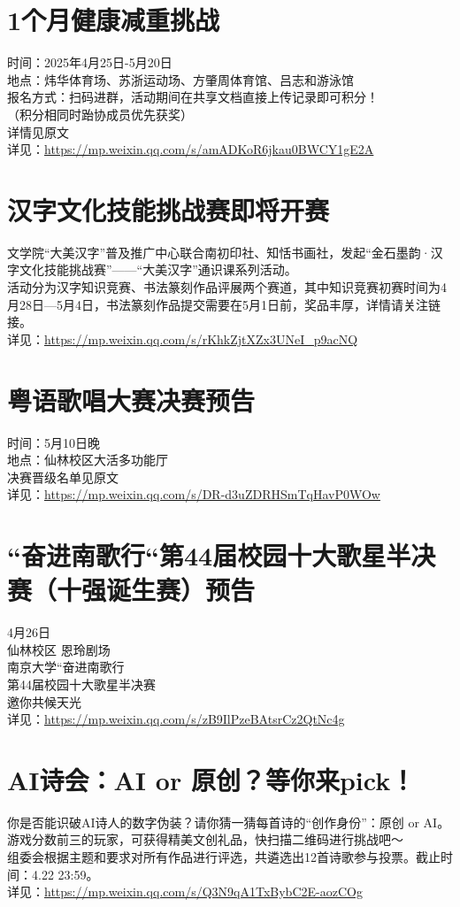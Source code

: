 \documentclass[letterpaper, 12pt]{article}
\begin{document}
\begin{multicols}{2}
\section{1个月健康减重挑战} %
时间：2025年4月25日-5月20日
\\地点：炜华体育场、苏浙运动场、方肇周体育馆、吕志和游泳馆
\\报名方式：扫码进群，活动期间在共享文档直接上传记录即可积分！ 
\\ （积分相同时跆协成员优先获奖）  
\\详情见原文
\\详见：\url{https://mp.weixin.qq.com/s/amADKoR6jkau0BWCY1gE2A}

\section{汉字文化技能挑战赛即将开赛} %
文学院“大美汉字”普及推广中心联合南初印社、知恬书画社，发起“金石墨韵·汉字文化技能挑战赛”——“大美汉字”通识课系列活动。
\\活动分为汉字知识竞赛、书法篆刻作品评展两个赛道，其中知识竞赛初赛时间为4月28日—5月4日，书法篆刻作品提交需要在5月1日前，奖品丰厚，详情请关注链接。
\\详见：\url{https://mp.weixin.qq.com/s/rKhkZjtXZx3UNeI_p9acNQ}

\section{粤语歌唱大赛决赛预告} %
时间：5月10日晚
\\地点：仙林校区大活多功能厅
\\决赛晋级名单见原文
\\详见：\url{https://mp.weixin.qq.com/s/DR-d3uZDRHSmTqHavP0WOw}

\section{“奋进南歌行“第44届校园十大歌星半决赛（十强诞生赛）预告} %
4月26日
\\仙林校区 恩玲剧场
\\南京大学“奋进南歌行
\\第44届校园十大歌星半决赛
\\邀你共候天光
\\详见：\url{https://mp.weixin.qq.com/s/zB9IlPzeBAtsrCz2QtNc4g}

\section{AI诗会：AI or 原创？等你来pick！} %
你是否能识破AI诗人的数字伪装？请你猜一猜每首诗的“创作身份”：原创 or AI。游戏分数前三的玩家，可获得精美文创礼品，快扫描二维码进行挑战吧～
\\组委会根据主题和要求对所有作品进行评选，共遴选出12首诗歌参与投票。截止时间：4.22 23:59。
\\详见：\url{https://mp.weixin.qq.com/s/Q3N9qA1TxBybC2E-aozCOg}


\end{multicols}
\end{document}
